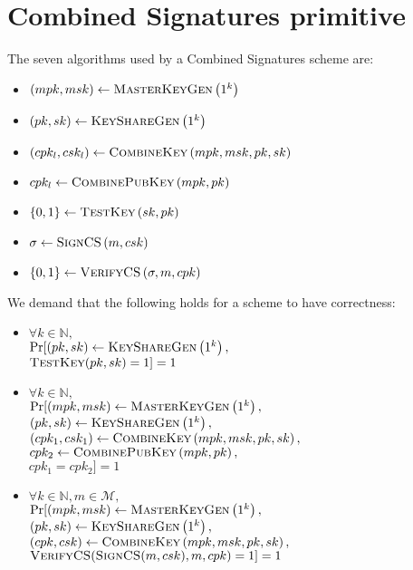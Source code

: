 \section{Combined Signatures primitive}
  \label{appendix:combinedsign}

  The seven algorithms used by a Combined Signatures scheme are:
  \begin{itemize}
    \item $\left(mpk, msk\right) \gets \textsc{MasterKeyGen}\left(1^k\right)$
    \item $\left(pk, sk\right) \gets \textsc{KeyShareGen}\left(1^k\right)$
    \item $\left(cpk_l, csk_l\right) \gets \textsc{CombineKey}\left(mpk,
    msk, pk, sk\right)$
    \item $cpk_l \gets \textsc{CombinePubKey}\left(mpk, pk\right)$
    \item $\{0, 1\} \gets \textsc{TestKey}\left(sk, pk\right)$
    \item $\sigma \gets \textsc{SignCS}\left(m, csk\right)$
    \item $\left\{0, 1\right\} \gets \textsc{VerifyCS}\left(\sigma, m,
    cpk\right)$
  \end{itemize}

  We demand that the following holds for a scheme to have correctness:
  \begin{itemize}
    \item $\forall k \in \mathbb{N},$ \\
    $\Pr[\left(pk, sk\right) \gets \textsc{KeyShareGen}\left(1^k\right),$ \\
    $\textsc{TestKey}(pk, sk) = 1] = 1$

    \item $\forall k \in \mathbb{N},$ \\
    $\Pr[(mpk, msk) \gets \textsc{MasterKeyGen}\left(1^k\right),$ \\
    $\left(pk, sk\right) \gets \textsc{KeyShareGen}\left(1^k\right),$ \\
    $\left(cpk_1, csk_1\right) \gets \textsc{CombineKey}\left(mpk, msk, pk,
    sk\right),$ \\
    $cpk_2 \gets \textsc{CombinePubKey}\left(mpk, pk\right),$ \\
    $cpk_1 = cpk_2] = 1$

    \item $\forall k \in \mathbb{N}, m \in \mathcal{M},$ \\
    $\Pr[(mpk, msk) \gets \textsc{MasterKeyGen}\left(1^k\right),$ \\
    $\left(pk, sk\right) \gets \textsc{KeyShareGen}\left(1^k\right),$ \\
    $\left(cpk, csk\right) \gets \textsc{CombineKey}\left(mpk, msk, pk,
    sk\right),$ \\
    $\textsc{VerifyCS}(\textsc{SignCS}(m, csk), m, cpk) = 1] = 1$
  \end{itemize}

